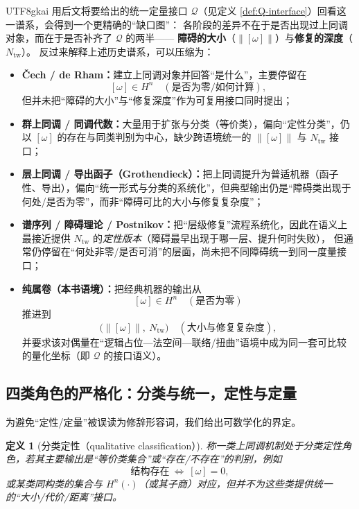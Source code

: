 \documentclass[12pt]{article}
\newtheorem{definition}{定义}[section]
\begin{document}
\begin{CJK*}{UTF8}{gkai}
用后文将要给出的统一定量接口 $\mathcal{Q}$（见定义 \ref{def:Q-interface}）回看这一谱系，会得到一个更精确的“缺口图”：
各阶段的差异不在于是否出现过上同调对象，而在于是否补齐了 $\mathcal{Q}$ 的两半——
\textbf{障碍的大小}（$\|[\omega]\|$）与\textbf{修复的深度}（$N_{\mathrm{tw}}$）。
反过来解释上述历史谱系，可以压缩为：
\begin{itemize}
  \item \textbf{\v{C}ech / de Rham：}建立上同调对象并回答“是什么”，主要停留在
        \[
          [\omega]\in H^n\quad(\text{是否为零/如何计算}),
        \]
        但并未把“障碍的大小”与“修复深度”作为可复用接口同时提出；
  \item \textbf{群上同调 / 同调代数：}大量用于扩张与分类（等价类），偏向“定性分类”，仍以 $[\omega]$ 的存在与同类判别为中心，缺少跨语境统一的 $\|[\omega]\|$ 与 $N_{\mathrm{tw}}
    $ 接口；
  \item \textbf{层上同调 / 导出函子（Grothendieck）：}把上同调提升为普适机器（函子性、导出），偏向“统一形式与分类的系统化”，但典型输出仍是“障碍类出现于何处/是否为零”，而非“障碍可比的大小与修复复杂度”；
  \item \textbf{谱序列 / 障碍理论 / Postnikov：}把“层级修复”流程系统化，因此在语义上最接近提供 $N_{\mathrm{tw}}$ 的\emph{定性版本}（障碍最早出现于哪一层、提升何时失败），
    但通常仍停留在“何处非零/是否可消”的层面，尚未把不同障碍统一到同一度量接口；
  \item \textbf{纯属卷（本书语境）：}把经典机器的输出从
        \[
          [\omega]\in H^n\quad(\text{是否为零})
        \]
        推进到
        \[
          \bigl(\|[\omega]\|,\ N_{\mathrm{tw}}\bigr)\quad(\text{大小与修复复杂度}),
        \]
        并要求该对偶量在“逻辑占位—法空间—联络/扭曲”语境中成为同一套可比较的量化坐标（即 $\mathcal{Q}$ 的接口语义）。
\end{itemize}

\subsection{四类角色的严格化：分类与统一，定性与定量}

为避免“定性/定量”被误读为修辞形容词，我们给出可数学化的界定。

\begin{definition}[分类定性（qualitative classification）]
称一类上同调机制处于\emph{分类定性}角色，若其主要输出是“等价类集合”或“存在/不存在”的判别，例如
\[
  \text{结构存在}\ \Longleftrightarrow\ [\omega]=0,
\]
或某类同构类的集合与 $H^n(\cdot)$（或其子商）对应，但\emph{并不}为这些类提供统一的“大小/代价/距离”接口。
\end{definition}


\end{CJK*}
\end{document}
